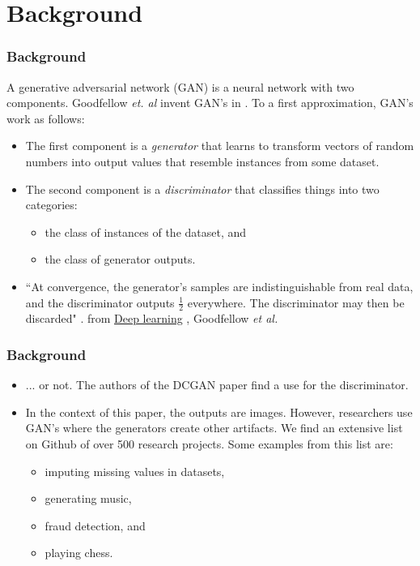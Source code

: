 \documentclass{beamer}
\begin{document}
\section{Background} 
\begin{frame}[allowframebreaks]
\frametitle{Background}
A generative adversarial network (GAN) is a neural network with two components. 
Goodfellow \textit{et. al} invent GAN's in \cite{gan}. To a first approximation,
GAN's work as follows:
\begin{itemize}
  \item The first component is a \textit{generator} that learns to transform vectors 
    of random numbers into output values that resemble instances from some dataset.  
  \item The second component is a \textit{discriminator} that classifies things into 
  two categories:
  \begin{itemize}
    \item the class of instances of the dataset, and
    \item the class of generator outputs.
  \end{itemize}
  \item ``At convergence, the generator’s samples are indistinguishable from real data,
     and the discriminator outputs $\frac{1}{2}$ everywhere. The discriminator may 
     then be discarded" \cite{deepLearnBookGenCh}. from \underline{Deep learning} , 
     Goodfellow \textit{et al.} 
\end{itemize}
\end{frame}

\begin{frame}[allowframebreaks]
\frametitle{Background}
\begin{itemize}

\item ... or not.  The authors of the DCGAN paper find a use for the discriminator.
  \item In the context of this paper, the outputs are images.  However, 
   researchers use GAN's where the generators create other artifacts. We find
   an extensive list on Github  \cite{ganList} of over 500 research projects. 
   Some examples from this list are:
  \begin{itemize}
    \item imputing missing values in datasets,
    \item generating music,
    \item fraud detection, and
    \item playing chess.
  \end{itemize}
\end{itemize}
\end{frame}
\end{document}
